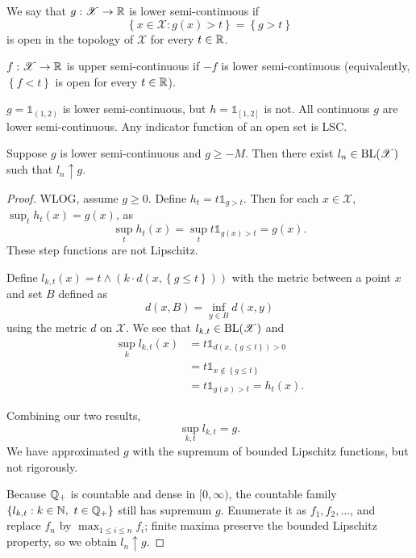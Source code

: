 \begin{definition}
	We say that $g: \mathscr{X}\to \mathbb{R}$ is lower semi-continuous if \[
		\left\{x \in \mathscr{X}: g(x) > t\right\}  = \left\{g> t\right\}
	\] is open in the topology of $\mathscr{X}$ for every $t \in \mathbb{R}$.

	$f: \mathscr{X} \to \mathbb{R}$ is upper semi-continuous if $-f$ is lower semi-continuous (equivalently, $\left\{f<t\right\}$ is open for every $t \in \mathbb{R}$).
\end{definition}

\begin{example}
	$g=\mathds{1}_{(1,2)}$ is lower semi-continuous, but $h=\mathds{1}_{[1,2]}$ is not. All continuous $g$ are lower semi-continuous. 
	Any indicator function of an open set is LSC.
\end{example}

\begin{lemma}
	Suppose $g$ is lower semi-continuous and $g \ge -M$. Then there exist $l_n \in \operatorname{BL}(\mathscr{X})$ such that $l_n \uparrow g$.
\end{lemma}

\begin{proof}
	WLOG, assume $g \ge 0$. Define $h_t = t \mathds{1}_{g > t}$. Then for each $x \in \mathscr{X}$, $\sup_t h_t(x) = g(x)$, as \[
		\sup_t h_t(x) = \sup_t t \mathds{1}_{g(x) > t} = g(x)
	.\] These step functions are not Lipschitz.

	Define $l_{k,t}(x) = t\wedge \left(k \cdot d\left( x, \left\{g \le t\right\} \right)\right)$ with the metric between a point $x$ and set $B$ defined as \[
		d(x,B) = \inf_{y \in B} d(x,y)
	\] 
	using the metric $d$ on $\mathscr{X}$.
	We see that $l_{k,t} \in \operatorname{BL}(\mathscr{X})$ and 
	\begin{align*}
		\sup_k l_{k,t}(x) &= t \mathds{1}_{d\left( x, \left\{g \le t\right\} \right) > 0} \\
						 &= t \mathds{1}_{x \not\in \left\{g\le t\right\}} \\
						 &= t \mathds{1}_{ g(x) > t} = h_t(x)
	.\end{align*}

	Combining our two results, \[
		\sup_{k,t} l_{k,t} = g
	.\] We have approximated $g$ with the supremum of bounded Lipschitz functions, but not rigorously.

	Because $\mathbb{Q}_+$ is countable and dense in $[0,\infty)$, the countable family $\left\{l_{k,t}: k \in \mathbb{N},\ t \in \mathbb{Q}_+\right\}$ still has supremum $g$. Enumerate it as $f_1,f_2,\ldots$, and replace $f_n$ by $\max_{1 \le i \le n} f_i$; finite maxima preserve the bounded Lipschitz property, so we obtain $l_n \uparrow g$.
\end{proof}

